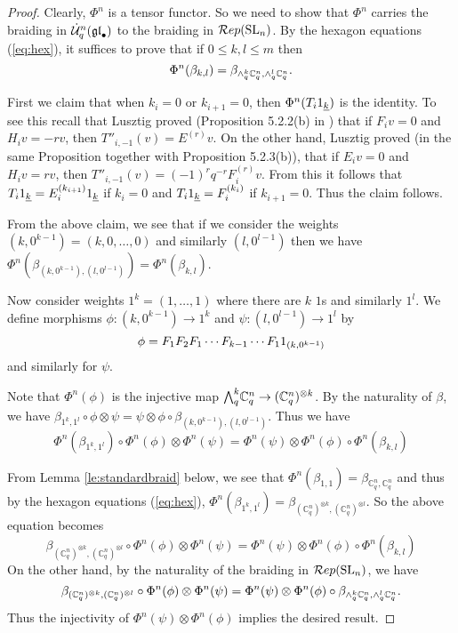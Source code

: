 \documentclass[11pt]{amsart}
\begin{document}
\begin{proof}
Clearly, $\Phi^n$ is a tensor functor.  So we need to show that $ \Phi^n $ carries the braiding in $ \dot{{\mathcal{U}}}_q^n({\mathfrak{gl}}_\bullet) $ to the braiding in $\mathcal{R}ep({\rm{SL}}_n) $.  By the hexagon equations (\ref{eq:hex}), it suffices to prove that if $ 0 \le k, l \le m $ then $$ \Phi^n(\beta_{k, l}) = \beta_{\wedge^{k}_{q} \mathbb C_q^n, \wedge^{l}_{q} \mathbb C_q^n}. $$

First we claim that when $ k_i = 0 $ or $ k_{i+1} = 0 $, then $ \Phi^n(T_i 1_{{\underline{k}}}) $ is the identity.  To see this recall that Lusztig proved (Proposition 5.2.2(b) in \cite{MR1227098}) that if $ F_i v = 0 $ and $ H_i v = -r v $, then $ T''_{i,-1}(v) = E^{(r)} v $.  On the other hand, Lusztig proved (in the same Proposition together with Proposition 5.2.3(b)), that if $ E_i v = 0 $ and $H_i v = rv $, then $ T''_{i,-1}(v) = (-1)^r q^{-r} F_i^{(r)} v $.  From this it follows that $ T_i 1_{{\underline{k}}} = E_i^{(k_{i+1})} 1_{{\underline{k}}} $ if $ k_i = 0 $ and $ T_i 1_{{\underline{k}}} = F_i^{(k_i)} $ if $ k_{i+1} = 0 $.  Thus the claim follows.

From the above claim, we see that if we consider the weights $ (k, 0^{k-1}) = (k, 0, \dots, 0)$ and similarly $ (l, 0^{l-1}) $ then we have $ \Phi^n(\beta_{(k, 0^{k-1}), (l, 0^{l-1})}) =  \Phi^n(\beta_{k, l})$.

Now consider weights $ 1^k = (1, \dots, 1) $ where there are $ k $ $1$s and similarly $ 1^l$.  We define morphisms $ \phi: (k, 0^{k-1})  \rightarrow 1^k$ and  $ \psi : (l, 0^{l-1}) \rightarrow 1^{l} $ by
$$
\phi = F_1 F_2 F_1 \cdots F_{k-1} \cdots F_1 1_{(k, 0^{k-1})}
$$
and similarly for $ \psi $.

Note that $ \Phi^n(\phi) $ is the injective map $ {\textstyle\bigwedge^{k}_{q}} \mathbb C_q^n \rightarrow (\mathbb C_q^n)^{\otimes k} $.  By the naturality of $ \beta $, we have $  \beta_{1^k, 1^l} \circ \phi \otimes \psi =  \psi \otimes \phi \circ \beta_{(k,0^{k-1}), (l, 0^{l-1})} $.  Thus we have
$$
  \Phi^n(\beta_{1^k, 1^l})\circ \Phi^n(\phi) \otimes \Phi^n(\psi) = \Phi^n(\psi) \otimes \Phi^n(\phi) \circ \Phi^n(\beta_{k,l})
$$

From Lemma \ref{le:standardbraid} below, we see that $ \Phi^n(\beta_{1,1}) = \beta_{\mathbb C_q^n, \mathbb C_q^n} $ and thus by the hexagon equations (\ref{eq:hex}), $\Phi^n(\beta_{1^k, 1^l}) = \beta_{(\mathbb C_q^n)^{\otimes k}, (\mathbb C_q^n)^{\otimes l}} $.  So the above equation becomes
$$
 \beta_{(\mathbb C_q^n)^{\otimes k}, (\mathbb C_q^n)^{\otimes l}} \circ \Phi^n(\phi) \otimes \Phi^n(\psi) = \Phi^n(\psi) \otimes \Phi^n(\phi) \circ  \Phi^n(\beta_{k,l})
$$
On the other hand, by the naturality of the braiding in $\mathcal{R}ep({\rm{SL}}_n)$, we have 
$$
 \beta_{(\mathbb C_q^n)^{\otimes k}, (\mathbb C_q^n)^{\otimes l}} \circ \Phi^n(\phi) \otimes \Phi^n(\psi) = \Phi^n(\psi) \otimes \Phi^n(\phi) \circ \beta_{\wedge^{k}_{q} \mathbb C_q^n, \wedge^{l}_{q} \mathbb C_q^n}.
$$
Thus the injectivity of $ \Phi^n(\psi) \otimes \Phi^n(\phi)$ implies the desired result.
\end{proof}
\end{document}
